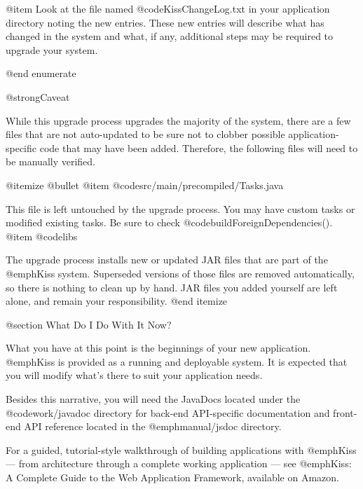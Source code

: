 @item
Look at the file named @code{KissChangeLog.txt} in your application
directory noting the new entries.  These new entries will describe
what has changed in the system and what, if any, additional steps may
be required to upgrade your system.

@end enumerate

@strong{Caveat}

While this upgrade process upgrades the majority of the system, there
are a few files that are not auto-updated to be sure not to clobber
possible application-specific code that may have been added.
Therefore, the following files will need to be manually verified.

@itemize @bullet
@item
@code{src/main/precompiled/Tasks.java}

This file is left untouched by the upgrade process.  You may have
custom tasks or modified existing tasks.  Be sure to check
@code{buildForeignDependencies()}.
@item
@code{libs}

The upgrade process installs new or updated JAR files that are part of
the @emph{Kiss} system.  Superseded versions of those files are removed
automatically, so there is nothing to clean up by hand.  JAR files you
added yourself are left alone, and remain your responsibility.
@end itemize


@section What Do I Do With It Now?

What you have at this point is the beginnings of your new application.
@emph{Kiss} is provided as a running and deployable system.  It is
expected that you will modify what's there to suit your application
needs.

Besides this narrative, you will need the JavaDocs located under the
@code{work/javadoc} directory for back-end API-specific documentation and
front-end API reference located in the @emph{manual/jsdoc} directory.

For a guided, tutorial-style walkthrough of building applications with
@emph{Kiss} --- from architecture through a complete working
application --- see @emph{Kiss: A Complete Guide to the Web Application
Framework}, available on Amazon.

